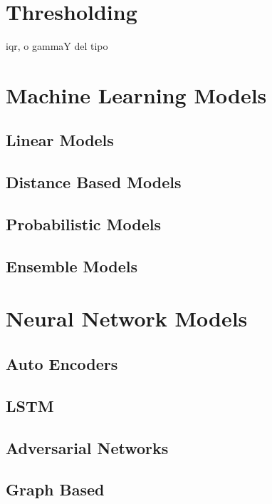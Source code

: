 \section{Thresholding}
iqr, o gammaY del tipo

\section{Machine Learning Models}
\subsection{Linear Models}
\subsection{Distance Based Models}
\subsection{Probabilistic Models}
\subsection{Ensemble Models}

\section{Neural Network Models}
\subsection{Auto Encoders}
\subsection{LSTM}
\subsection{Adversarial Networks}
\subsection{Graph Based}